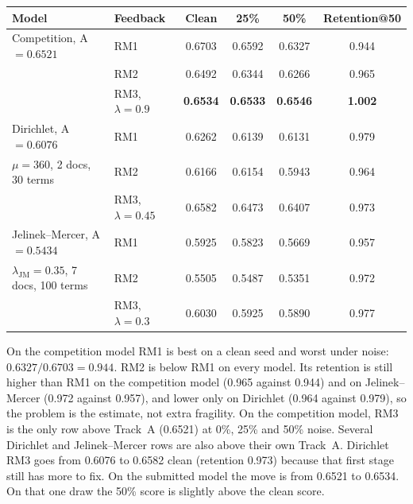 \documentclass[10pt,a4paper]{article}
\begin{document}
\begin{center}
\footnotesize
\begin{tabular}{llcccc}
\toprule
Model & Feedback & Clean & 25\% & 50\% & Retention@50 \\
\midrule
Competition, A${=}0.6521$ & RM1 & 0.6703 & 0.6592 & 0.6327 & 0.944 \\
 & RM2 & 0.6492 & 0.6344 & 0.6266 & 0.965 \\
 & RM3, $\lambda{=}0.9$ & \textbf{0.6534} & \textbf{0.6533} & \textbf{0.6546} & \textbf{1.002} \\
\midrule
Dirichlet, A${=}0.6076$ & RM1 & 0.6262 & 0.6139 & 0.6131 & 0.979 \\
$\mu{=}360$, 2 docs, 30 terms & RM2 & 0.6166 & 0.6154 & 0.5943 & 0.964 \\
 & RM3, $\lambda{=}0.45$ & 0.6582 & 0.6473 & 0.6407 & 0.973 \\
\midrule
Jelinek--Mercer, A${=}0.5434$ & RM1 & 0.5925 & 0.5823 & 0.5669 & 0.957 \\
$\lambda_{\mathrm{JM}}{=}0.35$, 7 docs, 100 terms & RM2 & 0.5505 & 0.5487 & 0.5351 & 0.972 \\
 & RM3, $\lambda{=}0.3$ & 0.6030 & 0.5925 & 0.5890 & 0.977 \\
\bottomrule
\end{tabular}
\end{center}

On the competition model RM1 is best on a clean seed and worst under noise: $0.6327/0.6703 = 0.944$. RM2 is below RM1 on every model. Its retention is still higher than RM1 on the competition model (0.965 against 0.944) and on Jelinek--Mercer (0.972 against 0.957), and lower only on Dirichlet (0.964 against 0.979), so the problem is the estimate, not extra fragility. On the competition model, RM3 is the only row above Track~A (0.6521) at 0\%, 25\% and 50\% noise. Several Dirichlet and Jelinek--Mercer rows are also above their own Track~A. Dirichlet RM3 goes from 0.6076 to 0.6582 clean (retention 0.973) because that first stage still has more to fix. On the submitted model the move is from 0.6521 to 0.6534. On that one draw the 50\% score is slightly above the clean score.
\end{document}
